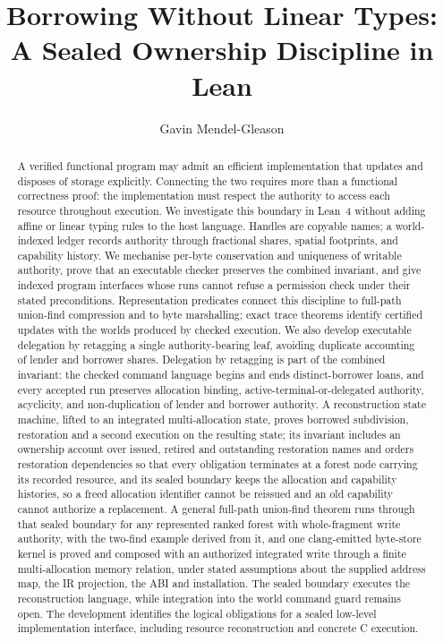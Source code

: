 \documentclass[a4paper,UKenglish,cleveref]{lipics-v2021}
\title{Borrowing Without Linear Types: A Sealed Ownership Discipline in Lean}
\author{Gavin Mendel-Gleason}{Scidonia Limited}{gavin@scidonia.ai}{}{}
\begin{document}
\maketitle

\begin{abstract}
A verified functional program may admit an efficient implementation that updates
and disposes of storage explicitly. Connecting the two requires more than a
functional correctness proof: the implementation must respect the authority to
access each resource throughout execution. We investigate this boundary in
Lean~4 without adding affine or linear typing rules to the host language.
Handles are copyable names; a world-indexed ledger records authority through
fractional shares, spatial footprints, and capability history. We mechanise
per-byte conservation and uniqueness of writable authority, prove that an
executable checker preserves the combined invariant, and give indexed program
interfaces whose runs cannot refuse a permission check under their stated
preconditions. Representation predicates connect this discipline to full-path
union-find compression and to byte marshalling; exact trace theorems identify
certified updates with the worlds produced by checked execution. We also develop
executable delegation by retagging a single authority-bearing leaf, avoiding
duplicate accounting of lender and borrower shares. Delegation by retagging is
part of the combined invariant: the checked command language begins and ends
distinct-borrower loans, and every accepted run preserves allocation binding,
active-terminal-or-delegated authority, acyclicity, and non-duplication of
lender and borrower authority. A reconstruction state machine, lifted to an
integrated multi-allocation state, proves borrowed subdivision, restoration and
a second execution on the resulting state; its invariant includes an ownership
account over issued, retired and outstanding restoration names and orders
restoration dependencies so that every obligation terminates at a forest node
carrying its recorded resource, and its sealed boundary keeps the allocation
and capability histories, so a freed allocation identifier cannot be reissued
and an old capability cannot authorize a replacement. A general full-path
union-find theorem runs through that sealed boundary for any represented ranked
forest with whole-fragment write authority, with the two-find example derived
from it, and one clang-emitted byte-store kernel is proved and composed with an
authorized integrated write through a finite multi-allocation memory relation,
under stated assumptions about the supplied address map, the IR projection, the
ABI and installation. The sealed boundary executes
the reconstruction language, while integration into the world command guard
remains open. The development identifies the logical
obligations for a sealed low-level implementation interface, including resource
reconstruction and concrete C execution.
\end{abstract}
\end{document}
